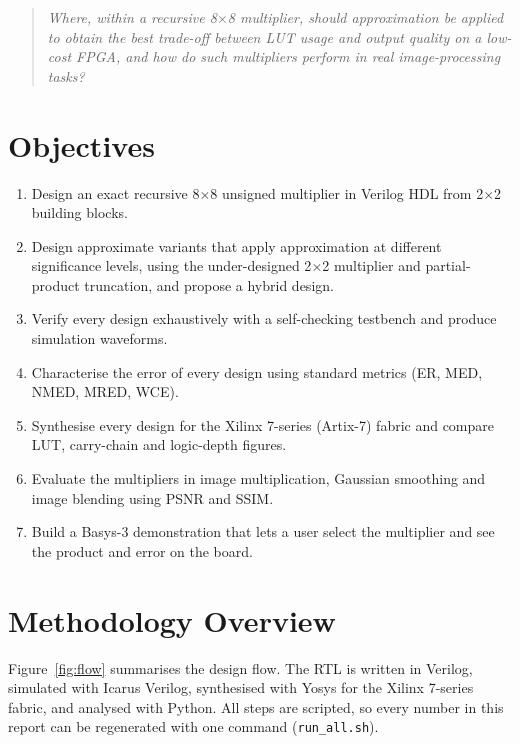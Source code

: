 \documentclass[12pt,a4paper,oneside]{report}
\begin{document}
\begin{quote}
\emph{Where, within a recursive 8$\times$8 multiplier, should approximation be applied to obtain the best trade-off between LUT usage and output quality on a low-cost FPGA, and how do such multipliers perform in real image-processing tasks?}
\end{quote}

\section{Objectives}
\begin{enumerate}
\item Design an exact recursive 8$\times$8 unsigned multiplier in Verilog HDL from 2$\times$2 building blocks.
\item Design approximate variants that apply approximation at different significance levels, using the under-designed 2$\times$2 multiplier and partial-product truncation, and propose a hybrid design.
\item Verify every design exhaustively with a self-checking testbench and produce simulation waveforms.
\item Characterise the error of every design using standard metrics (ER, MED, NMED, MRED, WCE).
\item Synthesise every design for the Xilinx 7-series (Artix-7) fabric and compare LUT, carry-chain and logic-depth figures.
\item Evaluate the multipliers in image multiplication, Gaussian smoothing and image blending using PSNR and SSIM.
\item Build a Basys-3 demonstration that lets a user select the multiplier and see the product and error on the board.
\end{enumerate}

\section{Methodology Overview}
Figure~\ref{fig:flow} summarises the design flow. The RTL is written in Verilog, simulated with Icarus Verilog, synthesised with Yosys for the Xilinx 7-series fabric, and analysed with Python. All steps are scripted, so every number in this report can be regenerated with one command (\texttt{run\_all.sh}).
\end{document}
